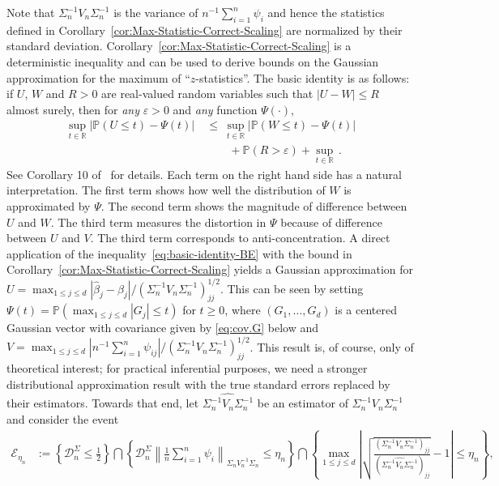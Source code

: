 \documentclass{article}
\begin{document}
Note that $\Sigma_n^{-1}V_n\Sigma_n^{-1}$ is the variance of $n^{-1}\sum_{i=1}^n \psi_i$ and hence the statistics defined in Corollary~\ref{cor:Max-Statistic-Correct-Scaling} are normalized by their standard deviation. Corollary~\ref{cor:Max-Statistic-Correct-Scaling} is a deterministic inequality and can be used to derive bounds on the Gaussian approximation for the maximum of ``$z$-statistics''. The basic identity is as follows: if $U$, $W$ and $R > 0$ are real-valued random variables such that $|U - W| \le R$ almost surely, then for \emph{any} $\varepsilon > 0$ and \emph{any} function $\Psi(\cdot)$,
\begin{equation}\label{eq:basic-identity-BE}
\begin{split}
\sup_{t\in\mathbb{R}}|\mathbb{P}(U \le t) - \Psi(t)| ~&\le~ \sup_{t\in\mathbb{R}}|\mathbb{P}(W \le t) - \Psi(t)|\\ &\qquad+ \mathbb{P}(R > \varepsilon) + \sup_{t\in\mathbb{R}}\,.
\end{split}
\end{equation}
See Corollary 10 of~\cite{paulauskas1996rates} for details.
Each term on the right hand side has a natural interpretation. The first term shows how well the distribution of $W$ is approximated by $\Psi$. The second term shows the magnitude of difference between $U$ and $W$. The third term measures the distortion in $\Psi$ because of difference between $U$ and $V$. The third term corresponds to anti-concentration.
A direct application of the inequality~\eqref{eq:basic-identity-BE} with the bound in Corollary~\ref{cor:Max-Statistic-Correct-Scaling} yields a Gaussian approximation for $U = \max_{1\le j\le d}|\widehat{\beta}_j - \beta_j|/(\Sigma_n^{-1}V_n\Sigma_n^{-1})_{jj}^{1/2}$. This can be seen by
setting $\Psi(t) = \mathbb{P}(\max_{1\le j\le d}|G_j| \le t)$ for $t\ge0$,
where $(G_1,\ldots,G_d)$ is a centered Gaussian vector with covariance given by \eqref{eq:cov.G} below and $V = \max_{1\le j\le d}|{ n^{-1}\sum_{i=1}^n \psi_{ij}}|/{(\Sigma_n^{-1}V_n\Sigma_n^{-1})_{jj}^{1/2}}$.
This result is, of course, only of theoretical interest;
for practical inferential purposes, we need a stronger distributional approximation result with the true standard errors replaced by their estimators. Towards that end, let $\widehat{\Sigma_n^{-1}V_n\Sigma_n^{-1}}$ be an estimator of $\Sigma_n^{-1}V_n\Sigma_n^{-1}$ and consider the event
\begin{equation}\label{eq:key.event}
\begin{split}
\mathcal{E}_{\eta_n} &:= \left\{\mathcal{D}_n^{\Sigma} \le
\frac{1}{2}\right\} \bigcap
\left\{\mathcal{D}_n^{\Sigma}\left\|\frac{1}{n}\sum_{i=1}^n
\psi_i\right\|_{\Sigma_n V^{-1}_n\Sigma_n} \le
\eta_n\right\}
\bigcap\left\{\max_{1\le j\le
d}
\left|\sqrt{\frac{(\Sigma_n^{-1}V_n\Sigma_n^{-1})_{jj}}{(\widehat{\Sigma_n^{-1}V_n\Sigma_n^{-1}})_{jj}}}- 1\right| \le \eta_n\right\},
\end{split}
\end{equation}
\end{document}
